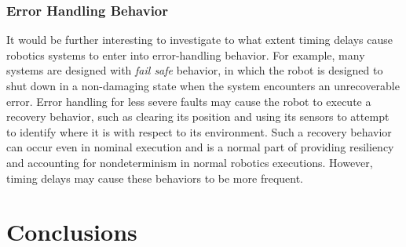 \documentclass[conference]{IEEEtran}
\newcommand{\todo}[1]{\textcolor{violet}{{\bfseries [[TODO: #1]]}}}
\begin{document}
\subsubsection{Error Handling Behavior}

It would be further interesting to investigate to what extent timing delays cause
robotics systems to enter into error-handling behavior.
For example, many systems are designed with \emph{fail safe} behavior, in which
the robot is designed to shut down in a non-damaging state when the system encounters
an unrecoverable error.
Error handling for less severe faults may cause the robot to execute a recovery
behavior, such as clearing its position and using its sensors to attempt to
identify where it is with respect to its environment.
Such a recovery behavior can occur even in nominal execution and is a normal part
of providing resiliency and accounting for nondeterminism in normal robotics executions.
However, timing delays may cause these behaviors to be more frequent.

\section{Conclusions}






\end{document}
